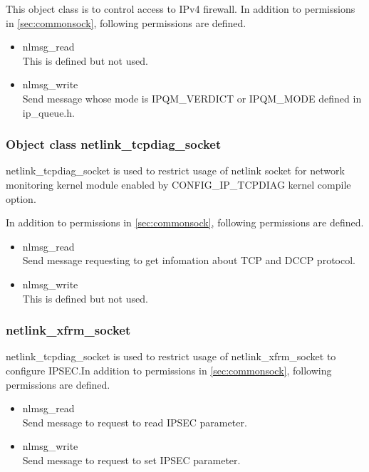 \documentclass{article}
\begin{document}
This object class is to control access to IPv4 firewall. 
 In addition to permissions in \ref{sec:commonsock}, following permissions are defined. 
\begin{itemize}
 \item         nlmsg\_read \\ 
	       This is defined but not used.
 \item         nlmsg\_write\\
	       Send message whose mode is IPQM\_VERDICT or IPQM\_MODE
	       defined in ip\_queue.h. 
\end{itemize} 

\subsubsection{Object class netlink\_tcpdiag\_socket}
netlink\_tcpdiag\_socket is used to restrict usage of  netlink socket
for network monitoring kernel module enabled by CONFIG\_IP\_TCPDIAG
kernel compile option.



In addition to permissions in \ref{sec:commonsock}, following permissions are defined. 
\begin{itemize}
 \item    nlmsg\_read\\
	  Send message requesting to get infomation about TCP and
	  DCCP protocol. 
 \item nlmsg\_write\\
 This is defined but not used.
\end{itemize}

\subsubsection{netlink\_xfrm\_socket} %
netlink\_tcpdiag\_socket is used to restrict usage of
netlink\_xfrm\_socket to configure IPSEC.In addition to permissions
in \ref{sec:commonsock}, following permissions are defined. 
\begin{itemize}
 \item    nlmsg\_read\\
	  Send message to request to read  IPSEC parameter.
 \item nlmsg\_write\\
	  Send message to request to set IPSEC parameter.
\end{itemize}
\end{document}
